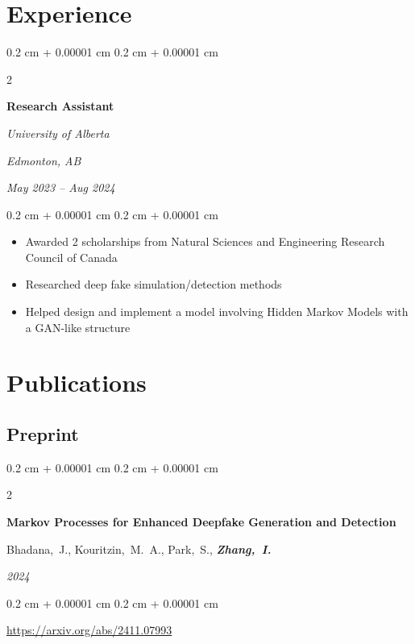 \documentclass[10pt, letterpaper]{article}
\newenvironment{highlights}{
    \begin{itemize}[
        topsep=0.10 cm,
        parsep=0.10 cm,
        partopsep=0pt,
        itemsep=0pt,
        leftmargin=0.4 cm + 10pt
    ]
}{
    \end{itemize}
} %
\newenvironment{onecolentry}{
    \begin{adjustwidth}{
        0.2 cm + 0.00001 cm
    }{
        0.2 cm + 0.00001 cm
    }
}{
    \end{adjustwidth}
} %
\newenvironment{twocolentry}[2][]{
    \onecolentry
    \def\secondColumn{#2}
    \setcolumnwidth{\fill, 4.5 cm}
    \begin{paracol}{2}
}{
    \switchcolumn \raggedleft \secondColumn
    \end{paracol}
    \endonecolentry
} %
\begin{document}
    
    \section{Experience}

        \begin{twocolentry}{
        \textit{Edmonton, AB}    
            
        \textit{May 2023 – Aug 2024}}
            \textbf{Research Assistant}
            
            \textit{University of Alberta}
        \end{twocolentry}

        \vspace{0.10 cm}
        \begin{onecolentry}
            \begin{highlights}
                \item Awarded 2 scholarships from Natural Sciences and Engineering Research Council of Canada
                \item Researched deep fake simulation/detection methods
                \item Helped design and implement a model involving Hidden Markov Models with a GAN-like structure
            \end{highlights}
        \end{onecolentry}


        \vspace{0.2 cm}


    \section{Publications}
    \subsection{Preprint}

        \begin{samepage}
            \begin{twocolentry}{
                \textit{2024}
            }
                \textbf{Markov Processes for Enhanced Deepfake Generation and
                Detection}

                \vspace{0.10 cm}

                \mbox{Bhadana, J.}, \mbox{Kouritzin, M. A.}, \mbox{Park, S.}, \mbox{\textbf{\textit{Zhang, I.}}}
            \end{twocolentry}
            \vspace{0.10 cm}
            \begin{onecolentry}
                \url{https://arxiv.org/abs/2411.07993}
            \end{onecolentry}
        \end{samepage}
\end{document}

